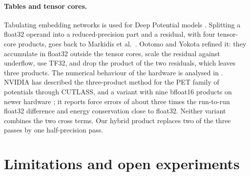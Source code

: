 \documentclass[11pt]{article}
\begin{document}
\paragraph{Tables and tensor cores.}
Tabulating embedding networks is used for Deep Potential models \cite{lu2022dpcompress}. Splitting a float32
operand into a reduced-precision part and a residual, with four tensor-core products, goes back to Markidis et
al.\ \cite{markidis2018tensorcores}. Ootomo and Yokota \cite{ootomo2022tf32} refined it: they accumulate in
float32 outside the tensor cores, scale the residual against underflow, use TF32, and drop the product of the
two residuals, which leaves three products. The numerical behaviour of the hardware is analysed in
\cite{fasi2021tensorcores}. NVIDIA has described the three-product
method for the PET family of potentials through CUTLASS, and a variant with nine bfloat16 products on newer
hardware \cite{nvidia2026tf32x3}; it reports force errors of about three times the run-to-run float32
difference and energy conservation close to float32. Neither variant combines the two cross terms. Our hybrid
product replaces two of the three passes by one half-precision pass.

\section{Limitations and open experiments}
\label{sec:limits}
\end{document}
